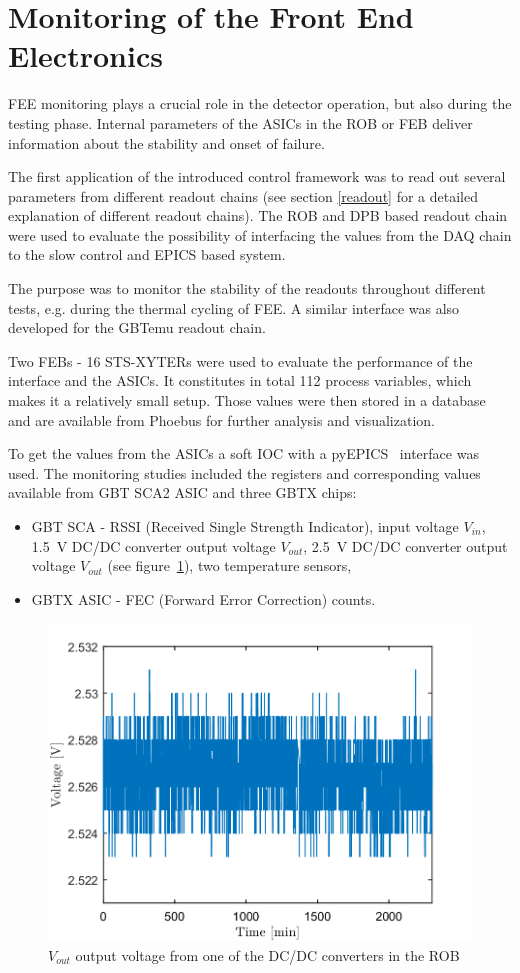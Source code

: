 
\section{Monitoring of the Front End Electronics}

\gls{FEE} monitoring plays a crucial role in the detector operation, but also during the testing phase. Internal parameters of the \glspl{ASIC} in the \gls{ROB} or \gls{FEB} deliver information about the stability and onset of failure.


The first application of the introduced control framework was to read out several parameters from different readout chains (see section \ref{readout} for a detailed explanation of different readout chains). The \gls{ROB} and \gls{DPB} based readout chain were used to evaluate the possibility of interfacing the values from the \gls{DAQ} chain to the slow control and \gls{EPICS} based system.

The purpose was to monitor the stability of the readouts throughout different tests, e.g. during the thermal cycling of \gls{FEE}. A similar interface was also developed for the GBTemu readout chain. 

Two \glspl{FEB} - 16 STS-XYTERs were used to evaluate the performance of the interface and the ASICs. It constitutes in total 112 process variables, which makes it a relatively small setup. Those values were then stored in a database and are available from Phoebus for further analysis and visualization.

To get the values from the \glspl{ASIC} a soft \gls{IOC} with a pyEPICS~\cite{pyEPICS} interface was used. The monitoring studies included the registers and corresponding values available from \gls{GBT} \gls{SCA2} \gls{ASIC} \cite{GBT_SCA_ASIC} and three GBTX chips: 
\begin{itemize}
    \item GBT SCA - RSSI (Received Single Strength Indicator), input voltage $V_{in}$, 1.5~V DC/DC converter output voltage $V_{out}$, 2.5~V DC/DC converter output voltage $V_{out}$ (see figure~\ref{fig:ROB}), two temperature sensors,
    \item GBTX \gls{ASIC} - FEC (Forward Error Correction) counts.
\end{itemize}

\begin{figure}[!h]
    \centering
    \includegraphics[width=0.65\columnwidth]{Chapter4/images/ROB.png}
    \caption{$V_{out}$ output voltage from one of the DC/DC converters in the \gls{ROB}}
    \label{fig:ROB}
\end{figure}

